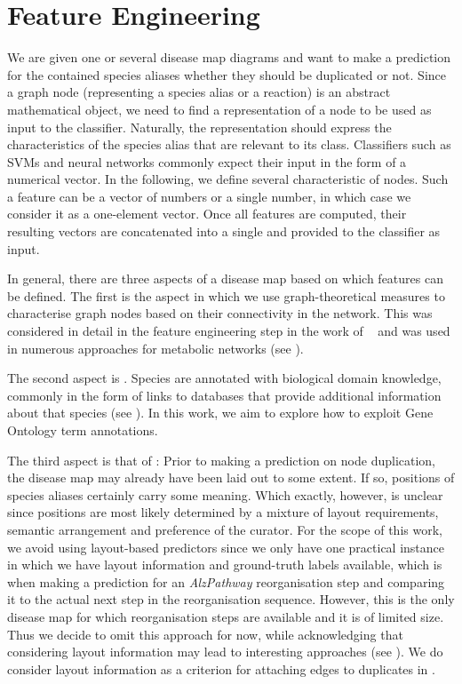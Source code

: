 \documentclass[
	fontsize=10pt, %
	twoside=true, %
	secnumdepth=1, %
  toc=indentunnumbered %
]{kaobook}
\begin{document}
\section{Feature Engineering}
\label{sec:feature-engineering}

We are given one or several disease map diagrams and want to make a prediction
for the contained species aliases whether they should be duplicated or not.
Since a graph node (representing a species alias or a reaction) is an abstract
mathematical object, we need to find a representation of a node to be used as
input to the classifier. Naturally, the representation should express the
characteristics of the species alias that are relevant to its class.
Classifiers such as SVMs and neural networks commonly expect their input in the form of a
numerical vector.
%
In the following, we define several characteristic  of
nodes. Such a feature can be a vector of numbers or a single
number, in which case we consider it as a one-element vector. Once all
features are computed, their resulting vectors are concatenated into a
single  and provided to the classifier as input.

In general, there are three aspects of a disease map based on which features
can be defined. The first is the  aspect in which we use
graph-theoretical measures to characterise graph nodes based
on their connectivity in the network. This was considered in detail in the
feature engineering step in the work of
\citeauthor{nielsen_MachineLearningSupport_2019}~\cite{nielsen_MachineLearningSupport_2019}
and was used in numerous
approaches for metabolic networks (see ).

The second aspect is . Species are annotated with biological
domain knowledge, commonly in the form of links to databases that provide
additional information about that species (see ). In
this work, we aim to explore how to exploit Gene Ontology term annotations.

The third aspect is that of : Prior to making a prediction on node
duplication, the disease map may already have been laid out to some extent.
If so, positions of species aliases certainly carry some meaning. Which exactly,
however, is unclear since positions are most likely determined by a mixture of
layout requirements, semantic arrangement and preference of the curator.
%
For the scope of this work, we avoid using layout-based predictors
since we only have one practical instance in which we have layout information
and ground-truth labels available, which is when making a prediction for an
\textit{AlzPathway} reorganisation step and comparing it to the actual next
step in the reorganisation sequence. However, this is the only disease map for
which reorganisation steps are available and it is of limited size. Thus we
decide to omit this approach for now, while acknowledging that considering
layout information may lead to interesting approaches (see
). We do consider layout information as a
criterion for attaching edges to duplicates in . 
\end{document}
